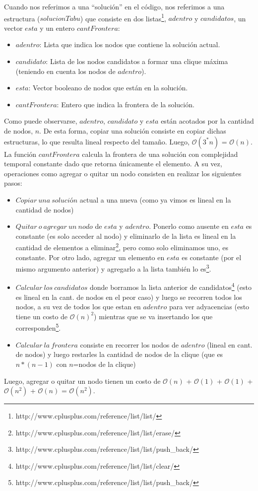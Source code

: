  Cuando nos referimos a una ``solución'' en el código, nos referimos a una estructura ($solucionTabu$) que consiste en dos listas\footnote{http://www.cplusplus.com/reference/list/list/}, $adentro$ y $candidatos$, un vector $esta$ y un entero $cantFrontera$:
\begin{itemize}
 \item $adentro$: Lista que indica los nodos que contiene la solución actual.
 \item $candidato$: Lista de los nodos candidatos a formar una clique máxima (teniendo en cuenta los nodos de $adentro$). 
 \item $esta$: Vector booleano de nodos que están en la solución.
 \item $cantFrontera$: Entero que indica la frontera de la solución.\newline
\end{itemize}
 Como puede observarse, $adentro$, $candidato$ y $esta$ están acotados por la cantidad de nodos, $n$. De esta forma, copiar una solución consiste en copiar dichas estructuras, lo que resulta lineal respecto del tamaño. Luego, $\mathcal{O}(3^*n)$ = $\mathcal{O}(n)$.\newline 
 La función $cantFrontera$ calcula la frontera de una solución con complejidad temporal constante dado que retorna únicamente el elemento. A su vez, operaciones como agregar o quitar un nodo consisten en realizar los siguientes pasos: \newline
\begin{itemize}
 \item $Copiar\ una\ solución$ actual a una nueva (como ya vimos es lineal en la cantidad de nodos)
 \item $Quitar\ o\ agregar\ un\ nodo$ de $esta$ y $adentro$. Ponerlo como ausente en $esta$ es constante (es solo acceder al nodo) y eliminarlo de la lista es lineal en la cantidad de elementos a eliminar\footnote{http://www.cplusplus.com/reference/list/list/erase/}, pero como solo eliminamos uno, es constante. Por otro lado, agregar un elemento en $esta$ es constante (por el mismo argumento anterior) y agregarlo a la lista también lo es\footnote{http://www.cplusplus.com/reference/list/list/push\_back/}.
 \item $Calcular\ los\ candidatos$ donde borramos la lista anterior de candidatos\footnote{http://www.cplusplus.com/reference/list/list/clear/} (esto es lineal en la cant. de nodos en el peor caso) y luego se recorren todos los nodos, a su vez de todos los que estan en $adentro$ para ver adyacencias (esto tiene un costo de $\mathcal{O}(n)^{2}$) mientras que se va insertando los que corresponden\footnote{http://www.cplusplus.com/reference/list/list/push\_back/}.
 \item $Calcular\ la\ frontera$ consiste en recorrer los nodos de $adentro$ (lineal en cant. de nodos) y luego restarles la cantidad de nodos de la clique (que es $n*(n-1)$ con $n$=nodos de la clique)
\end{itemize}
 Luego, agregar o quitar un nodo tienen un costo de $\mathcal{O}(n)$ + $\mathcal{O}(1)$ + $\mathcal{O}(1)$ + $\mathcal{O}(n^2)$ + $\mathcal{O}(n)$ = $\mathcal{O}(n^2)$.\newline

